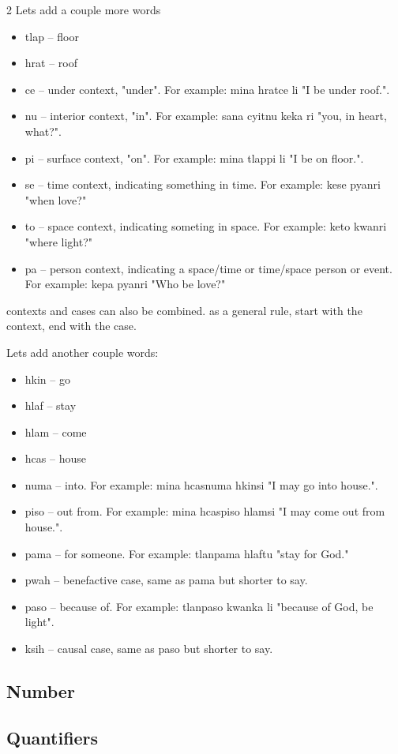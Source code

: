 \documentclass[10pt,pagesize]{article}
\providecommand{\tightlist}{%
  \setlength{\itemsep}{0pt}\setlength{\parskip}{0pt}}
\begin{document}
\begin{multicols}{2}
Lets add a couple more words
\begin{itemize}\tightlist
  \item tlap -- floor
  \item hrat -- roof
\end{itemize}

\begin{itemize}\tightlist
  \item ce -- under context, "under". For example: mina hratce li "I be under roof.".
  \item nu -- interior context, "in". For example: sana cyitnu keka ri "you, in heart, what?".
  \item pi -- surface context, "on". For example: mina tlappi li "I be on floor.".
  \item se -- time context, indicating something in time. For example: kese pyanri "when love?"
  \item to -- space context, indicating someting in space. For example: keto kwanri "where light?"
  \item pa -- person context, indicating a space/time or time/space person or event. For example: kepa pyanri "Who be love?"
\end{itemize}

contexts and cases can also be combined. as a general rule, start with the context, end with the case. 

Lets add another couple words:

\begin{itemize}\tightlist
  \item hkin -- go
  \item hlaf -- stay
  \item hlam -- come
  \item hcas -- house
\end{itemize}

\begin{itemize}\tightlist
  \item numa -- into. For example: mina hcasnuma hkinsi "I may go into house.".
  \item piso -- out from. For example: mina hcaspiso hlamsi "I may come out from house.".
  \item pama -- for someone. For example: tlanpama hlaftu "stay for God."
  \item pwah -- benefactive case, same as pama but shorter to say. 
  \item paso -- because of. For example: tlanpaso kwanka li "because of God, be light".
  \item ksih -- causal case, same as paso but shorter to say. 
\end{itemize}

\subsection{Number}
\subsection{Quantifiers}
\end{multicols}
\scriptsize

\end{document}
